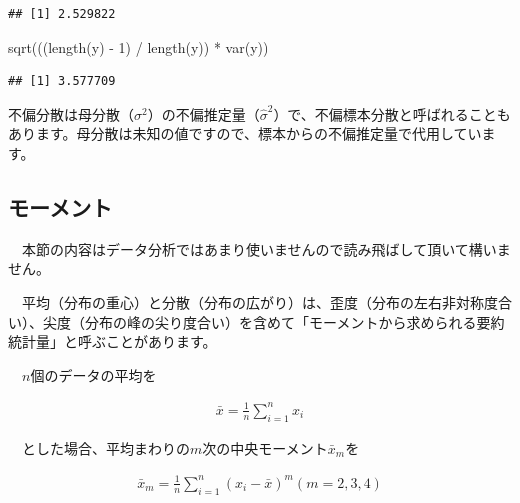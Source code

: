 \documentclass[
  12pt,
]{book}
\newenvironment{Shaded}{\begin{snugshade}}{\end{snugshade}}
\newcommand{\DecValTok}[1]{\textcolor[rgb]{0.00,0.00,0.81}{#1}}
\newcommand{\FunctionTok}[1]{\textcolor[rgb]{0.00,0.00,0.00}{#1}}
\newcommand{\NormalTok}[1]{#1}
\newcommand{\SpecialCharTok}[1]{\textcolor[rgb]{0.00,0.00,0.00}{#1}}
\begin{document}
\begin{verbatim}
## [1] 2.529822
\end{verbatim}

\begin{Shaded}
\begin{Highlighting}[numbers=left,,]
\FunctionTok{sqrt}\NormalTok{(((}\FunctionTok{length}\NormalTok{(y) }\SpecialCharTok{{-}} \DecValTok{1}\NormalTok{) }\SpecialCharTok{/} \FunctionTok{length}\NormalTok{(y)) }\SpecialCharTok{*} \FunctionTok{var}\NormalTok{(y))}
\end{Highlighting}
\end{Shaded}

\begin{verbatim}
## [1] 3.577709
\end{verbatim}

\begin{hint-box}
不偏分散は母分散（\(\sigma^2\)）の不偏推定量（\(\hat{\sigma}^2\)）で、不偏標本分散と呼ばれることもあります。母分散は未知の値ですので、標本からの不偏推定量で代用しています。

\end{hint-box}

\newpage

\hypertarget{ux30e2ux30fcux30e1ux30f3ux30c8}{%
\subsection{\texorpdfstring{モーメント}{モーメント}}\label{ux30e2ux30fcux30e1ux30f3ux30c8}}

　本節の内容はデータ分析ではあまり使いませんので読み飛ばして頂いて構いません。

　平均（分布の重心）と分散（分布の広がり）は、歪度（分布の左右非対称度合い）、尖度（分布の峰の尖り度合い）を含めて「モーメントから求められる要約統計量」と呼ぶことがあります。

　\(n\)個のデータの平均を

\begin{align}
  \bar{x} = \frac{1}{n}\sum_{i = 1}^{n}x_i \label{eq:moment1}
\end{align}

　とした場合、平均まわりの\(m\)次の中央モーメント\(\bar{x}_m\)を

\begin{align}
  \bar{x}_m = \frac{1}{n}\sum_{i = 1}^{n}(x_i - \bar{x})^m　　(m = 2, 3, 4) \label{eq:moment}
\end{align}
\end{document}
